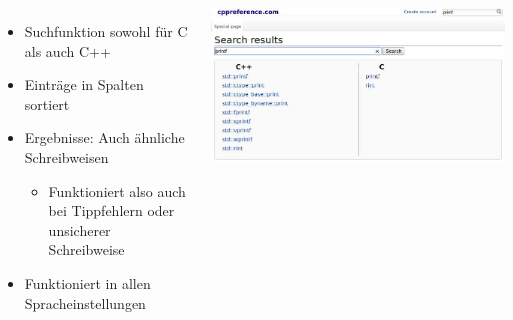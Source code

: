 
\begin{frame}
%
\begin{columns}%
\begin{itemize}
\item Suchfunktion sowohl für C als auch C++
\item Einträge in Spalten sortiert
\item Ergebnisse: Auch ähnliche Schreibweisen
	\begin{itemize}
	\item Funktioniert also auch bei Tippfehlern oder unsicherer Schreibweise
	\end{itemize}		
\item Funktioniert in allen Spracheinstellungen
\end{itemize}
%
\includegraphics[width=\linewidth]{./gfx/cpp-search}
\end{columns}
%
\end{frame}


